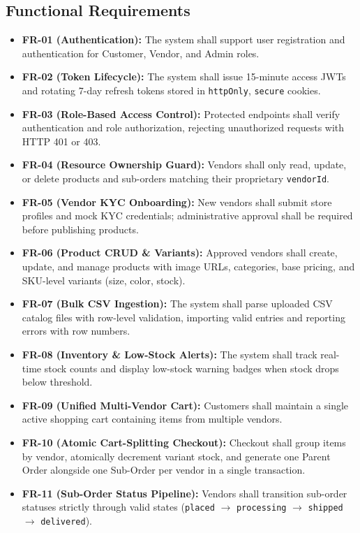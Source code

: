 \documentclass[12pt,a4paper]{report}
\begin{document}
\subsection{Functional Requirements}
\begin{itemize}[leftmargin=1.5cm]
    \item \textbf{FR-01 (Authentication):} The system shall support user registration and authentication for Customer, Vendor, and Admin roles.
    \item \textbf{FR-02 (Token Lifecycle):} The system shall issue 15-minute access JWTs and rotating 7-day refresh tokens stored in \texttt{httpOnly}, \texttt{secure} cookies.
    \item \textbf{FR-03 (Role-Based Access Control):} Protected endpoints shall verify authentication and role authorization, rejecting unauthorized requests with HTTP 401 or 403.
    \item \textbf{FR-04 (Resource Ownership Guard):} Vendors shall only read, update, or delete products and sub-orders matching their proprietary \texttt{vendorId}.
    \item \textbf{FR-05 (Vendor KYC Onboarding):} New vendors shall submit store profiles and mock KYC credentials; administrative approval shall be required before publishing products.
    \item \textbf{FR-06 (Product CRUD \& Variants):} Approved vendors shall create, update, and manage products with image URLs, categories, base pricing, and SKU-level variants (size, color, stock).
    \item \textbf{FR-07 (Bulk CSV Ingestion):} The system shall parse uploaded CSV catalog files with row-level validation, importing valid entries and reporting errors with row numbers.
    \item \textbf{FR-08 (Inventory \& Low-Stock Alerts):} The system shall track real-time stock counts and display low-stock warning badges when stock drops below threshold.
    \item \textbf{FR-09 (Unified Multi-Vendor Cart):} Customers shall maintain a single active shopping cart containing items from multiple vendors.
    \item \textbf{FR-10 (Atomic Cart-Splitting Checkout):} Checkout shall group items by vendor, atomically decrement variant stock, and generate one Parent Order alongside one Sub-Order per vendor in a single transaction.
    \item \textbf{FR-11 (Sub-Order Status Pipeline):} Vendors shall transition sub-order statuses strictly through valid states (\texttt{placed} $\rightarrow$ \texttt{processing} $\rightarrow$ \texttt{shipped} $\rightarrow$ \texttt{delivered}).

\end{itemize}
\end{document}
